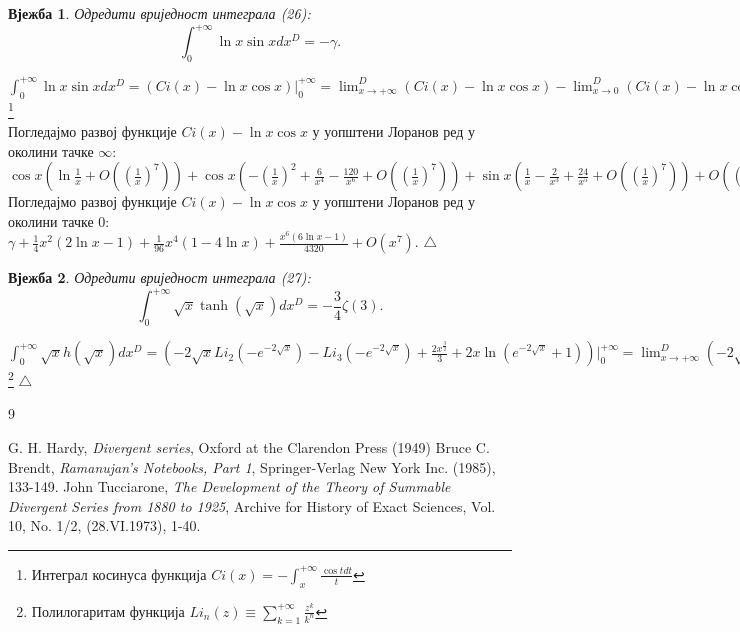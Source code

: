 \documentclass[12pt]{article}
\newtheorem{exercise}{Вјежба}
\newenvironment{instruction}{\noindent {\sc Упутство:}}{$\triangle$ \medskip}
\begin{document}
\begin{exercise}{Одредити вриједност интеграла (26):}
$$\int_0^{+\infty} \ln x \sin x dx^D= -\gamma.$$
\end{exercise} \begin{instruction}
$\int_0^{+\infty} \ln x \sin x dx^D=(Ci(x)-\ln x \cos x) |_0^{+\infty}=\lim_{x\to+\infty}^D(Ci(x)-\ln x \cos x)-\lim_{x\to 0}^D(Ci(x)-\ln x \cos x)=0-\gamma=-\gamma.$\footnote{Интеграл косинуса функција $Ci(x)=-\int_x^{+\infty} \frac{\cos t dt}{t}$} \\
Погледајмо развој функције $Ci(x)-\ln x \cos x$ у уопштени Лоранов ред у околини тачке $\infty$:\\
$\cos x(\ln\frac{1}{x}+O((\frac{1}{x})^7))+\cos x(-(\frac{1}{x})^2+\frac{6}{x^4}-\frac{120}{x^6}+O((\frac{1}{x})^7))+\sin x(\frac{1}{x}-\frac{2}{x^3}+\frac{24}{x^5}+O((\frac{1}{x})^7))+O((\frac{1}{x})^9)-i\pi \lfloor \frac{1}{2}-\frac{arg(x)}{\pi}\rfloor+0.$\\
Погледајмо развој функције $Ci(x)-\ln x \cos x$ у уопштени Лоранов ред у околини тачке $0$:\\
$\gamma+\frac{1}{4}x^2(2\ln x-1)+\frac{1}{96}x^4(1-4\ln x)+\frac{x^6(6\ln x-1)}{4320}+O(x^7).$
\end{instruction}

\begin{exercise}{Одредити вриједност интеграла (27):}
$$\int_0^{+\infty} \sqrt{x} \tanh (\sqrt{x}) dx^D= -\frac{3}{4}\zeta(3).$$
\end{exercise} \begin{instruction}
$\int_0^{+\infty} \sqrt{x} h (\sqrt{x}) dx^D=(-2\sqrt{x}Li_2(-e^{-2\sqrt{x}})-Li_3(-e^{-2\sqrt{x}})+\frac{2x^\frac{3}{2}}{3}+2x\ln (e^{-2\sqrt{x}}+1)) |_0^{+\infty}=\lim_{x\to+\infty}^D(-2\sqrt{x}Li_2(-e^{-2\sqrt{x}})-Li_3(-e^{-2\sqrt{x}})+\frac{2x^\frac{3}{2}}{3}+2x\ln (e^{-2\sqrt{x}}+1)+0)-\frac{3\zeta(3)}{4}=0-\frac{3\zeta(3)}{4}=-\frac{3\zeta(3)}{4}.$\footnote{Полилогаритам функција $Li_n(z)\equiv\sum_{k=1}^{+\infty} \frac{z^k}{k^n}$}
\end{instruction}

\begin{thebibliography}{9}

 G. H. Hardy, {\it Divergent series}, Oxford at the Clarendon Press (1949) 
 Bruce C. Brendt, {\it Ramanujan's Notebooks, Part 1}, Springer-Verlag New York Inc. (1985), 133-149.
 John Tucciarone, {\it The Development of the Theory of Summable Divergent Series from 1880 to 1925}, Archive for History of Exact Sciences, Vol. 10, No. 1/2, (28.VI.1973), 1-40.

\end{thebibliography}
\end{document}
